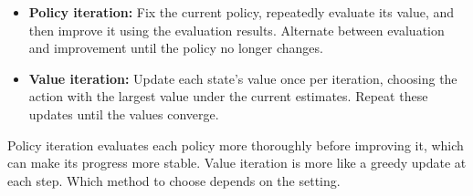 \documentclass[a4paper,10pt]{article}
\begin{document}
\begin{itemize}
  \item \textbf{Policy iteration:} Fix the current policy, repeatedly evaluate its value, and then improve it using the evaluation results. Alternate between evaluation and improvement until the policy no longer changes.
  \item \textbf{Value iteration:} Update each state's value once per iteration, choosing the action with the largest value under the current estimates. Repeat these updates until the values converge.
\end{itemize}

Policy iteration evaluates each policy more thoroughly before improving it, which can make its progress more stable. Value iteration is more like a greedy update at each step. Which method to choose depends on the setting.
\end{document}
